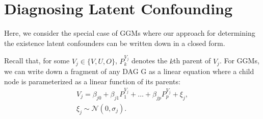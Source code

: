 \documentclass[letterpaper]{article}
\begin{document}
\section{Diagnosing Latent Confounding} 

Here, we consider the special case of GGMs where our approach for determining the existence latent confounders can be written down in a closed form. 

Recall that, for some $V_j \in \{V, U, O\}$, $P^{V_j}_k$ denotes the $k$th parent of $V_j$.  For GGMs, we can write down a fragment of any DAG G as a linear equation where a child node is parameterized as a linear function of its parents:
\begin{equation}
\begin{align*}
V_j = \beta_{j0} + \beta_{j1} P^{V_j}_1 + \dots + \beta_{jp} P^{V_j}_p + \xi_j,\\\xi_j \sim \mathcal{N}(0, \sigma_j).
\end{align*}
\end{equation}	
\end{document}
